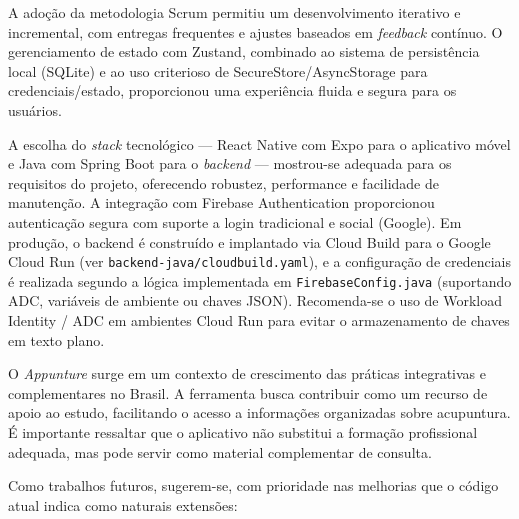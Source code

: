 A adoção da metodologia Scrum permitiu um desenvolvimento iterativo e incremental, com entregas frequentes e ajustes baseados em \textit{feedback} contínuo. O gerenciamento de estado com Zustand, combinado ao sistema de persistência local (SQLite) e ao uso criterioso de SecureStore/AsyncStorage para credenciais/estado, proporcionou uma experiência fluida e segura para os usuários.

A escolha do \textit{stack} tecnológico --- React Native com Expo para o aplicativo móvel e Java com Spring Boot para o \textit{backend} --- mostrou-se adequada para os requisitos do projeto, oferecendo robustez, performance e facilidade de manutenção. A integração com Firebase Authentication proporcionou autenticação segura com suporte a login tradicional e social (Google). Em produção, o backend é construído e implantado via Cloud Build para o Google Cloud Run (ver \texttt{backend-java/cloudbuild.yaml}), e a configuração de credenciais é realizada segundo a lógica implementada em \texttt{FirebaseConfig.java} (suportando ADC, variáveis de ambiente ou chaves JSON). Recomenda-se o uso de Workload Identity / ADC em ambientes Cloud Run para evitar o armazenamento de chaves em texto plano.

O \textit{Appunture} surge em um contexto de crescimento das práticas integrativas e complementares no Brasil. A ferramenta busca contribuir como um recurso de apoio ao estudo, facilitando o acesso a informações organizadas sobre acupuntura. É importante ressaltar que o aplicativo não substitui a formação profissional adequada, mas pode servir como material complementar de consulta.

Como trabalhos futuros, sugerem-se, com prioridade nas melhorias que o código atual indica como naturais extensões:

